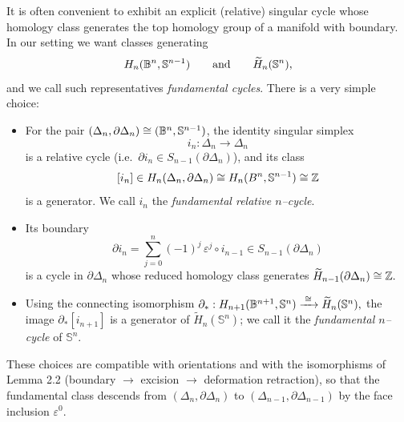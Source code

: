 \begin{remark}\label{remark 2.15}
    
It is often convenient to exhibit an explicit (relative) singular cycle whose
homology class generates the top homology group of a manifold with boundary.
In our setting we want classes generating
\[
H_n(\mathbb{B}^n,\mathbb{S}^{n-1}) \qquad\text{and}\qquad \widetilde H_n(\mathbb{S}^n),
\]
and we call such representatives \emph{fundamental cycles}.
There is a very simple choice:

\begin{itemize}
\item For the pair $(\Delta_n,\partial\Delta_n)\cong(\mathbb{B}^n,\mathbb{S}^{n-1})$,
the identity singular simplex
\[
i_n:\Delta_n\longrightarrow \Delta_n
\]
is a relative cycle (i.e.\ $\partial i_n\in S_{n-1}(\partial\Delta_n)$), and its
class
\[
[i_n]\in H_n(\Delta_n,\partial\Delta_n)\cong H_n(B^n,\mathbb{S}^{n-1})\cong\Bbb Z
\]
is a generator. We call $i_n$ the \emph{fundamental relative $n$–cycle}.
\item Its boundary
\[
\partial i_n=\sum_{j=0}^n (-1)^j\,\varepsilon^j\circ i_{n-1}\in S_{n-1}(\partial\Delta_n)
\]
is a cycle in $\partial\Delta_n$ whose reduced homology class generates
\(
\widetilde H_{n-1}(\partial\Delta_n)\cong \Bbb Z.
\)
\item Using the connecting isomorphism
\(
\partial_*:H_{n+1}(\mathbb{B}^{n+1},\mathbb{S}^n)\xrightarrow{\;\cong\;}\widetilde H_n(\mathbb{S}^n),
\)
the image $\partial_*[i_{n+1}]$ is a generator of $\widetilde H_n(\mathbb{S}^n)$;
we call it the \emph{fundamental $n$–cycle} of $\mathbb{S}^n$.
\end{itemize}

\noindent
These choices are compatible with orientations and with the isomorphisms of
Lemma 2.2 (boundary $\to$ excision $\to$ deformation retraction), so that
the fundamental class descends from $(\Delta_n,\partial\Delta_n)$ to
$(\Delta_{n-1},\partial\Delta_{n-1})$ by the face inclusion $\varepsilon^0$.
\end{remark}


